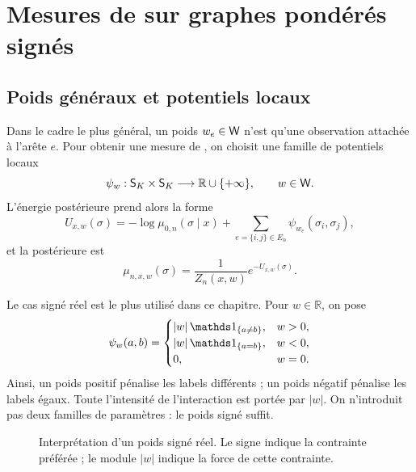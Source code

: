 \section{Mesures de  sur graphes pondérés signés}
\label{sec:chapII_gibbs_poids}

\subsection{Poids généraux et potentiels locaux}

Dans le cadre le plus général, un poids $w_e\in\mathsf W$ n'est qu'une observation attachée à l'arête $e$. Pour obtenir une mesure de , on choisit une famille de potentiels locaux
\[
    \psi_w:\mathsf S_K\times\mathsf S_K\longrightarrow\mathbb R\cup\{+\infty\},
    \qquad w\in\mathsf W.
\]
L'énergie postérieure prend alors la forme
\begin{equation}
    U_{x,w}(\sigma)
    =
    -\log\mu_{0,n}(\sigma\mid x)
    +
    \sum_{e=\{i,j\}\in E_n}\psi_{w_e}(\sigma_i,\sigma_j),
    \label{eq:chapII_energy_general_weights}
\end{equation}
et la postérieure est
\begin{equation}
    \mu_{n,x,w}(\sigma)=\frac1{Z_n(x,w)}e^{-U_{x,w}(\sigma)}.
    \label{eq:chapII_gibbs_general_weights}
\end{equation}

Le cas signé réel est le plus utilisé dans ce chapitre. Pour $w\in\mathbb R$, on pose
\begin{equation}
    \psi_w(a,b)
    =
    \begin{cases}
        |w|\,\ind{a\neq b},& w>0,\\
        |w|\,\ind{a=b},& w<0,\\
        0,& w=0.
    \end{cases}
    \label{eq:chapII_signed_potential}
\end{equation}
Ainsi, un poids positif pénalise les labels différents ; un poids négatif pénalise les labels égaux. Toute l'intensité de l'interaction est portée par $|w|$. On n'introduit pas deux familles de paramètres : le poids signé suffit.

\begin{figure}[H]
\centering
{}
\caption{Interprétation d'un poids signé réel. Le signe indique la contrainte préférée ; le module $|w|$ indique la force de cette contrainte.}
\label{fig:chapII_signed_weight}
\end{figure}

